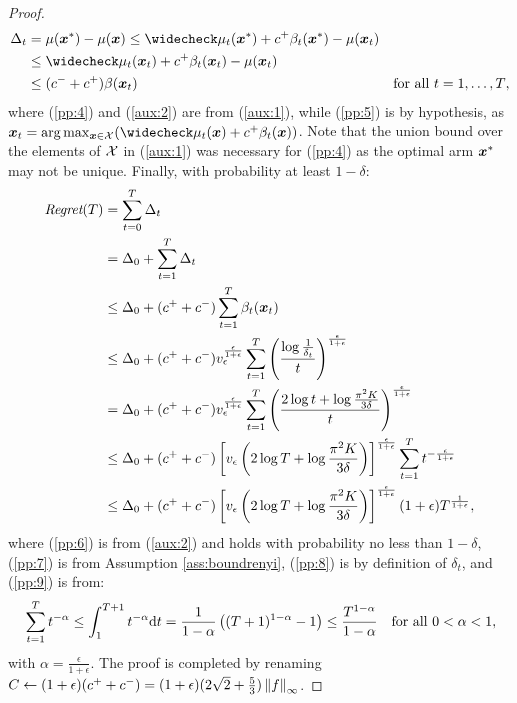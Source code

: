 \documentclass{article}
\begin{document}
\begin{proof}
\begin{align}
		\Delta_t &= \mu(\vx^*) - \mu(\vx) \leq 
		\wc{\mu_t}(\vx^*) + c^{+}\beta_t(\vx^*) - \mu(\vx_t) \label{pp:4}\\
		&\leq \wc{\mu_t}(\vx_t) + c^{+}\beta_t(\vx_t) - \mu(\vx_t) \label{pp:5}\\
		&\leq (c^{-} + c^{+})\beta(\vx_t) & \text{for all $t=1,\dots,T$}\label{aux:2}, 
	\end{align}
	where (\ref{pp:4}) and (\ref{aux:2}) are from (\ref{aux:1}), while (\ref{pp:5}) is by hypothesis, as $\vx_t=\arg\max_{\vx\in\Xspace}(\wc{\mu_t}(\vx) + c^{+}\beta_t(\vx))$.
	Note that the union bound over the elements of $\Xspace$ in (\ref{aux:1}) was necessary for (\ref{pp:4}) as the optimal arm $\vx^*$ may not be unique.
	Finally, with probability at least $1-\delta$:
	\begin{align}
		\Reg(T) &= \sum_{t=0}^{T}\Delta_t \nonumber\\
		&= \Delta_0  + \sum_{t=1}^{T}\Delta_t \nonumber\\
		&\leq \Delta_0  + (c^{+}+c^{-})\sum_{t=1}^{T}\beta_t(\vx_t) \label{pp:6}\\
		&\leq \Delta_0  + (c^{+}+c^{-})v_{\epsilon}^{\frac{\epsilon}{1+\epsilon}}\sum_{t=1}^{T}\left(\frac{\log\frac{1}{\delta_t}}{t}\right)^{\frac{\epsilon}{1+\epsilon}} \label{pp:7}\\
		&=\Delta_0  + (c^{+}+c^{-})v_{\epsilon}^{\frac{\epsilon}{1+\epsilon}}\sum_{t=1}^{T}\left(\frac{2\log t + \log\frac{\pi^2K}{3\delta}}{t}\right)^{\frac{\epsilon}{1+\epsilon}} \label{pp:8}\\
		&\leq \Delta_0  + (c^{+}+c^{-})\left[v_{\epsilon}\left(2\log T + \log\frac{\pi^2K}{3\delta}\right)\right]^{\frac{\epsilon}{1+\epsilon}}\sum_{t=1}^{T}t^{-\frac{\epsilon}{1+\epsilon}} \nonumber\\
		&\leq \Delta_0  + (c^{+}+c^{-})\left[v_{\epsilon}\left(2\log T + \log\frac{\pi^2K}{3\delta}\right)\right]^{\frac{\epsilon}{1+\epsilon}}(1+\epsilon)T^{\frac{1}{1+\epsilon}} \label{pp:9},
	\end{align}
	where (\ref{pp:6}) is from (\ref{aux:2}) and holds with probability no less than $1-\delta$, (\ref{pp:7}) is from Assumption \ref{ass:boundrenyi}, (\ref{pp:8}) is by definition of $\delta_t$, and (\ref{pp:9}) is from: 
	\begin{align}\label{aux:3}
		&\sum_{t=1}^{T}t^{-\alpha} \leq \int_{1}^{T+1}t^{-\alpha}\de t
		= \frac{1}{1-\alpha}\left((T+1)^{1-\alpha} - 1\right) \leq \frac{T^{1-\alpha}}{1-\alpha} &\text{for all $0<\alpha<1$},
	\end{align}
	with $\alpha=\frac{\epsilon}{1+\epsilon}$.
	The proof is completed by renaming $C\gets (1+\epsilon)(c^{+}+c^{-}) = (1+\epsilon)(2\sqrt{2} + \frac{5}{3})\norm[\infty]{f}$.
\end{proof}
\end{document}
